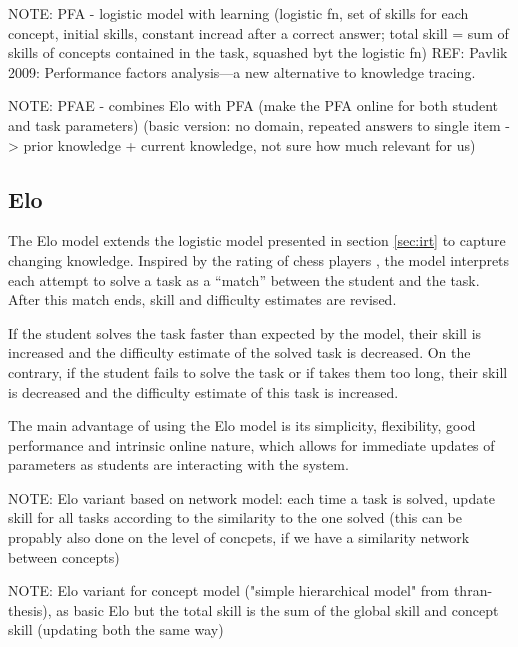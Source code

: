 NOTE: PFA - logistic model with learning (logistic fn, set of skills for each concept, initial skills, constant incread after a correct answer; total skill = sum of skills of concepts contained in the task, squashed byt the logistic fn)
REF: Pavlik 2009: Performance factors analysis—a new alternative to knowledge tracing.

NOTE: PFAE - combines Elo with PFA (make the PFA online for both student and task parameters)
(basic version: no domain, repeated answers to single item -> prior knowledge + current knowledge,
not sure how much relevant for us)



\subsection{Elo}
\label{sec:elo}

The Elo model \cite{alg.elo, irt-elo-math}
  extends the logistic model presented in section \ref{sec:irt}
  to capture changing knowledge.
Inspired by the rating of chess players \cite{elo-rating},
  the model interprets each attempt  to solve a task
  as a ``match'' between the student and the task.
After this match ends, skill and difficulty estimates are revised.

If the student solves the task faster than expected by the model,
  their skill is increased and the difficulty estimate of the solved task is decreased.
On the contrary, if the student fails to solve the task or if takes them too long,
  their skill is decreased and the difficulty estimate of this task is increased.


The main advantage of using the Elo model is its simplicity, flexibility,
  good performance and intrinsic online nature, which allows for immediate
  updates of parameters as students are interacting with the system.


NOTE: Elo variant based on network model: each time a task is solved, update skill for all tasks according to the similarity to the one solved (this can be propably also done on the level of concpets, if we have a similarity network between concepts)

NOTE: Elo variant for concept model ("simple hierarchical model" from thran-thesis),
as basic Elo but the total skill is the sum of the global skill and concept skill
(updating both the same way)

